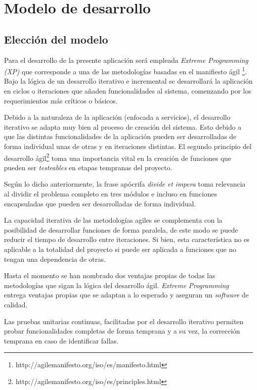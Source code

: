 
\chapter{Modelo de desarrollo}

\section{Elección del modelo}

Para el desarrollo de la presente aplicación será empleada \textit{Extreme Programming (XP)} que corresponde a una de las metodologías basadas en el manifiesto ágil \footnote{http://agilemanifesto.org/iso/es/manifesto.html}. Bajo la lógica de un desarrollo iterativo e incremental se desarrollará la aplicación en ciclos o iteraciones que añaden funcionalidades al sistema, comenzando por los requerimientos más críticos o básicos.

Debido a la naturaleza de la aplicación (enfocada a servicios), el desarrollo iterativo se adapta muy bien al proceso de creación del sistema. Esto debido a que las distintas funcionalidades de la aplicación pueden ser desarrolladas de forma individual unas de otras y en iteraciones distintas. El segundo principio del desarrollo ágil\footnote{http://agilemanifesto.org/iso/es/principles.html} toma una importancia vital en la creación de funciones que pueden ser \textit{testeables} en etapas tempranas del proyecto. 

Según lo dicho anteriormente, la frase apócrifa \textit{divide et impera} toma relevancia al dividir el problema completo en tres módulos e incluso en funciones encapsuladas que pueden ser desarrolladas de forma individual.

La capacidad iterativa de las metodologías agiles se complementa con la posibilidad de desarrollar funciones de forma paralela, de este modo se puede reducir el tiempo de desarrollo entre iteraciones. Si bien, esta característica no es aplicable a la totalidad del proyecto si puede ser aplicada a funciones que no tengan una dependencia de otras. 

Hasta el momento se han nombrado dos ventajas propias de todas las metodologías que sigan la lógica del desarrollo ágil. \textit{Extreme Programming} entrega ventajas propias que se adaptan a lo esperado y aseguran un \textit{software} de calidad. 

Las pruebas unitarias continuas, facilitadas por el desarrollo iterativo permiten probar funcionalidades completas de forma temprana y a su vez, la corrección temprana en caso de identificar fallas.

